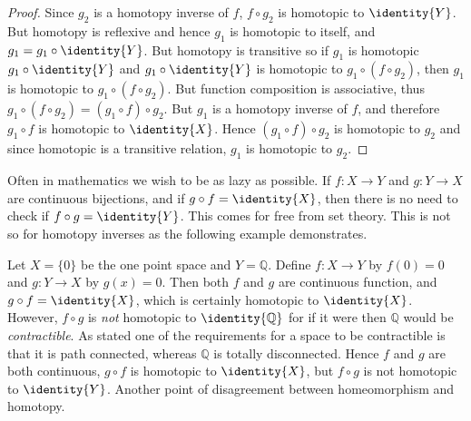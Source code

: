 \documentclass{book}                                                           %
\begin{document}
                \begin{proof}
                    Since $g_{2}$ is a homotopy inverse of $f$,
                    $f\circ{g}_{2}$ is homotopic to $\identity{Y}$. But homotopy
                    is reflexive and hence $g_{1}$ is homotopic to itself, and
                    $g_{1}=g_{1}\circ\identity{Y}$. But homotopy is transitive
                    so if $g_{1}$ is homotopic $g_{1}\circ\identity{Y}$ and
                    $g_{1}\circ\identity{Y}$ is homotopic to
                    $g_{1}\circ(f\circ{g}_{2})$, then $g_{1}$ is homotopic to
                    $g_{1}\circ(f\circ{g}_{2})$. But function composition is
                    associative, thus
                    $g_{1}\circ(f\circ{g}_{2})=(g_{1}\circ{f})\circ{g}_{2}$.
                    But $g_{1}$ is a homotopy inverse of $f$, and therefore
                    $g_{1}\circ{f}$ is homotopic to $\identity{X}$. Hence
                    $(g_{1}\circ{f})\circ{g}_{2}$ is homotopic to ${g}_{2}$ and
                    since homotopic is a transitive relation, $g_{1}$ is
                    homotopic to ${g}_{2}$.
                \end{proof}
                Often in mathematics we wish to be as lazy as possible. If
                $f:X\rightarrow{Y}$ and $g:Y\rightarrow{X}$ are continuous
                bijections, and if $g\circ{f}=\identity{X}$, then there is no
                need to check if $f\circ{g}=\identity{Y}$. This comes for free
                from set theory. This is not so for homotopy inverses as the
                following example demonstrates.
                \begin{example}
                    Let $X=\{0\}$ be the one point space and $Y=\mathbb{Q}$.
                    Define $f:X\rightarrow{Y}$ by $f(0)=0$ and
                    $g:Y\rightarrow{X}$ by $g(x)=0$. Then both $f$ and $g$ are
                    continuous function, and $g\circ{f}=\identity{X}$, which is
                    certainly homotopic to $\identity{X}$. However, $f\circ{g}$
                    is \textit{not} homotopic to $\identity{\mathbb{Q}}$ for if
                    it were then $\mathbb{Q}$ would be \textit{contractible}. As
                    stated one of the requirements for a space to be contractible
                    is that it is path connected, whereas $\mathbb{Q}$ is
                    totally disconnected. Hence $f$ and $g$ are both continuous,
                    $g\circ{f}$ is homotopic to $\identity{X}$, but
                    $f\circ{g}$ is not homotopic to $\identity{Y}$. Another
                    point of disagreement between homeomorphism and homotopy.
                \end{example}
\end{document}

